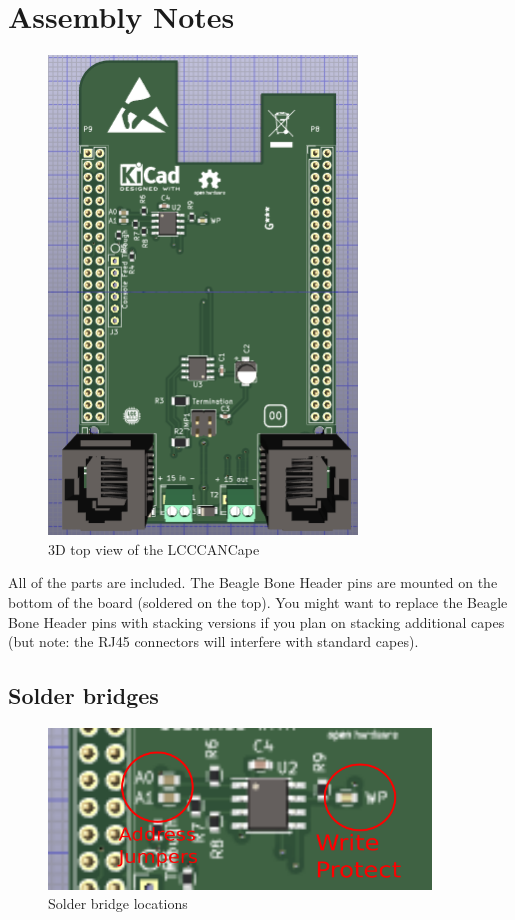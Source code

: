\documentclass[12pt,twoside]{article}
\begin{document}
\clearpage

\section{Assembly Notes}
\begin{figure}[hbpt]\begin{centering}%
\includegraphics[height=5in]{LCCCANCape3DTop2.png}
\caption{3D top view of the LCCCANCape}
\end{centering}\end{figure} 

All of the parts are included. The Beagle Bone Header pins are mounted on the
bottom of the board (soldered on the top). You might want to replace the
Beagle Bone Header pins with stacking versions if you plan on stacking
additional capes (but note: the RJ45 connectors will interfere with standard
capes). 

\subsection{Solder bridges}
\label{sec:SolderBridges}

\begin{figure}[hbpt]\begin{centering}%
\includegraphics[width=4in]{LCCCANCape3DTop2_annotated.png}
\caption{Solder bridge locations}
\end{centering}\end{figure}
\end{document}
